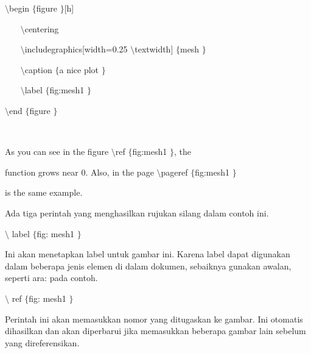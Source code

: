\vspace{20pt}
\vspace{24pt}
\noindent 
 $  \setminus $begin $  \{  $figure $  \}  $[h] \par
\vspace{12pt}
\noindent 
~~~  $  \setminus $centering \par
\vspace{12pt}
\noindent 
~~~  $  \setminus $includegraphics[width=0.25 $  \setminus $textwidth] $  \{  $mesh $  \}  $ \par
\vspace{12pt}
\noindent 
~~~  $  \setminus $caption $  \{  $a nice plot $  \}  $ \par
\vspace{12pt}
\noindent 
~~~  $  \setminus $label $  \{  $fig:mesh1 $  \}  $ \par
\vspace{12pt}
\noindent 
 $  \setminus $end $  \{  $figure $  \}  $ \par
\noindent 
 $  $ \par
\noindent 
As you can see in the figure  $  \setminus $ref $  \{  $fig:mesh1 $  \}  $, the  \par
\vspace{12pt}
\noindent 
function grows near 0. Also, in the page  $  \setminus $pageref $  \{  $fig:mesh1 $  \}  $  \par
\vspace{12pt}
\noindent 
is the same example. \par
\vspace{12pt}
\vspace{12pt}
\vspace{12pt}
\vspace{12pt}
\vspace{12pt}
\noindent 
Ada tiga perintah yang menghasilkan rujukan silang dalam contoh ini. \par
\vspace{12pt}
\noindent 
 $  \setminus $ label  $  \{  $fig: mesh1 $  \}  $ \par
\noindent 
Ini akan menetapkan label untuk gambar ini. Karena label dapat digunakan dalam beberapa jenis elemen di dalam dokumen, sebaiknya gunakan awalan, seperti ara: pada contoh. \par
\vspace{12pt}
\noindent 
 $  \setminus $ ref  $  \{  $fig: mesh1 $  \}  $ \par
\noindent 
Perintah ini akan memasukkan nomor yang ditugaskan ke gambar. Ini otomatis dihasilkan dan akan diperbarui jika memasukkan beberapa gambar lain sebelum yang direferensikan. \par
